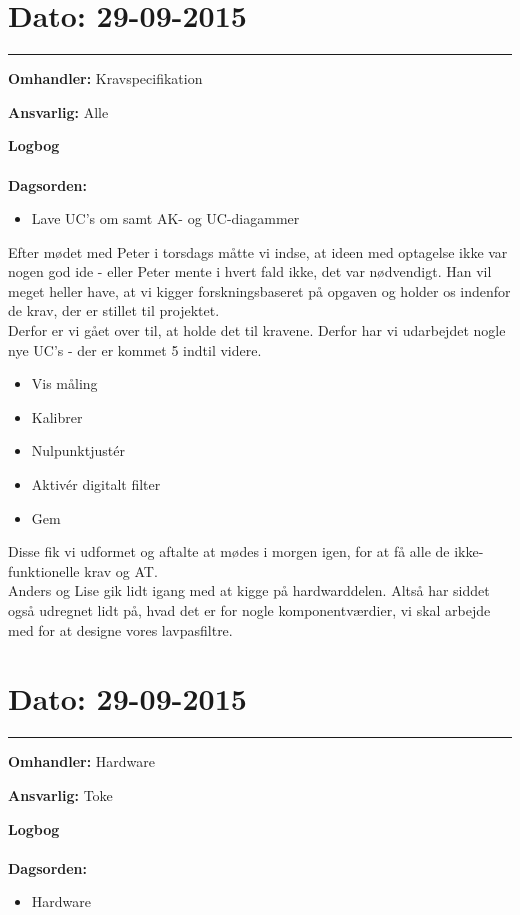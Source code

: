 \section{Dato: 29-09-2015 }
\hrule

\textbf{Omhandler:} Kravspecifikation 

\textbf{Ansvarlig:} Alle 

\textbf{Logbog}
\\
\\
\textbf{Dagsorden:}
\begin{itemize}
\item Lave UC's om samt AK- og UC-diagammer
\end{itemize}

Efter mødet med Peter i torsdags måtte vi indse, at ideen med optagelse ikke var nogen god ide - eller Peter mente i hvert fald ikke, det var nødvendigt. Han vil meget heller have, at vi kigger forskningsbaseret på opgaven og holder os indenfor de krav, der er stillet til projektet.\\
Derfor er vi gået over til, at holde det til kravene. Derfor har vi udarbejdet nogle nye UC's - der er kommet 5 indtil videre. 
\begin{itemize}
	\item Vis måling 
	\item Kalibrer
	\item Nulpunktjustér 
	\item Aktivér digitalt filter
	\item Gem 
\end{itemize}

Disse fik vi udformet og aftalte at mødes i morgen igen, for at få alle de ikke-funktionelle krav og AT. 
\\
Anders og Lise gik lidt igang med at kigge på hardwarddelen. Altså har siddet også udregnet lidt på, hvad det er for nogle komponentværdier, vi skal arbejde med for at designe vores lavpasfiltre.  




\section{Dato: 29-09-2015 }
\hrule

\textbf{Omhandler:} Hardware

\textbf{Ansvarlig:} Toke

\textbf{Logbog}
\\
\\
\textbf{Dagsorden:}
\begin{itemize}
	\item Hardware
\end{itemize}
	
